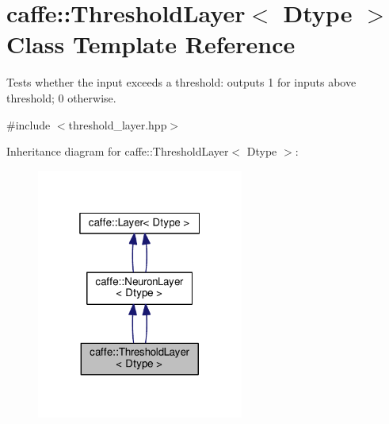 \hypertarget{classcaffe_1_1_threshold_layer}{}\section{caffe\+:\+:Threshold\+Layer$<$ Dtype $>$ Class Template Reference}
\label{classcaffe_1_1_threshold_layer}


Tests whether the input exceeds a threshold\+: outputs 1 for inputs above threshold; 0 otherwise.  




{\ttfamily \#include $<$threshold\+\_\+layer.\+hpp$>$}



Inheritance diagram for caffe\+:\+:Threshold\+Layer$<$ Dtype $>$\+:
\nopagebreak
\begin{figure}[H]
\begin{center}
\leavevmode
\includegraphics[width=193pt]{classcaffe_1_1_threshold_layer__inherit__graph}
\end{center}
\end{figure}
